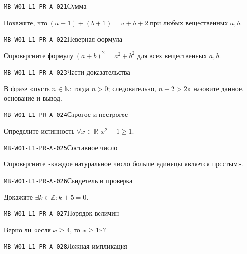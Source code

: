 \documentclass[11pt,a4paper,openany]{book}
\newcommand{\muid}[1]{\texttt{\footnotesize #1}}
\begin{document}
\noindent\hypertarget{MB-W01-L1-PR-A-021}{}\muid{MB-W01-L1-PR-A-021}\quad Сумма\par

Покажите, что $(a+1)+(b+1)=a+b+2$ при любых вещественных $a,b$.\par\medskip

\noindent\hypertarget{MB-W01-L1-PR-A-022}{}\muid{MB-W01-L1-PR-A-022}\quad Неверная формула\par

Опровергните формулу $(a+b)^2=a^2+b^2$ для всех вещественных $a,b$.\par\medskip

\noindent\hypertarget{MB-W01-L1-PR-A-023}{}\muid{MB-W01-L1-PR-A-023}\quad Части доказательства\par

В фразе «пусть $n\in\mathbb N$; тогда $n>0$; следовательно, $n+2>2$» назовите данное, основание и вывод.\par\medskip

\noindent\hypertarget{MB-W01-L1-PR-A-024}{}\muid{MB-W01-L1-PR-A-024}\quad Строгое и нестрогое\par

Определите истинность $\forall x\in\mathbb R\colon x^2+1\ge1$.\par\medskip

\noindent\hypertarget{MB-W01-L1-PR-A-025}{}\muid{MB-W01-L1-PR-A-025}\quad Составное число\par

Опровергните «каждое натуральное число больше единицы является простым».\par\medskip

\noindent\hypertarget{MB-W01-L1-PR-A-026}{}\muid{MB-W01-L1-PR-A-026}\quad Свидетель и проверка\par

Докажите $\exists k\in\mathbb Z\colon k+5=0$.\par\medskip

\noindent\hypertarget{MB-W01-L1-PR-A-027}{}\muid{MB-W01-L1-PR-A-027}\quad Порядок величин\par

Верно ли «если $x\ge4$, то $x\ge1$»?\par\medskip

\noindent\hypertarget{MB-W01-L1-PR-A-028}{}\muid{MB-W01-L1-PR-A-028}\quad Ложная импликация\par
\end{document}
